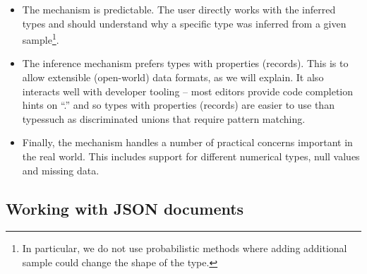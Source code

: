\documentclass[10pt,preprint,blind,clearpagebib]{sigplanconf}
\newcommand{\kvd}[1]{\textnormal{\textcolor{kvdclr}{\sffamily #1}}}
\begin{document}
\begin{itemize}
\item The mechanism is predictable. The user directly works with the inferred types and should 
  understand why a specific type was inferred from a given sample\footnote{In particular, we do 
  not use probabilistic methods where adding additional sample could change the shape of the type.}.

\item The inference mechanism prefers types with properties (records). This is to allow extensible (open-world)
  data formats, as we will explain. It also interacts well with developer tooling --
  most editors provide code completion hints on ``.'' and so types with properties (records)
  are easier to use than typessuch as discriminated unions that require pattern matching.

\item Finally, the mechanism handles a number of practical concerns important in the real world. This includes 
  support for different numerical types, \kvd{null} values and missing data.
\end{itemize}


\subsection{Working with JSON documents}
\label{sec:providers-json}
\end{document}
